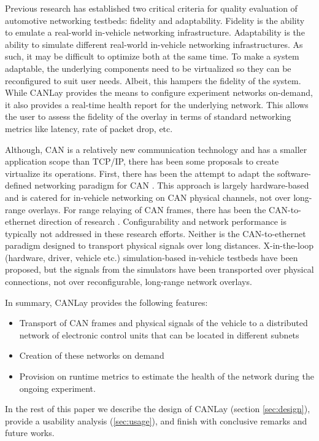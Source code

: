 \documentclass[letterpaper,twocolumn,12pt]{article}
\begin{document}
Previous research \cite{tagarev_automotive_2021} has established two critical criteria for quality evaluation of automotive networking testbeds: fidelity and adaptability. Fidelity is the ability to emulate a real-world in-vehicle networking infrastructure. Adaptability is the ability to simulate different real-world in-vehicle networking infrastructures. As such, it may be difficult to optimize both at the same time. To make a system adaptable, the underlying components need to be virtualized so they can be reconfigured to suit user needs. Albeit, this hampers the fidelity of the system. While CANLay provides the means to configure experiment networks on-demand, it also provides a real-time health report for the underlying network. This allows the user to assess the fidelity of the overlay in terms of standard networking metrics like latency, rate of packet drop, etc.

Although, CAN is a relatively new communication technology and has a smaller application scope than TCP/IP, there has been some proposals to create virtualize its operations. 
First, there has been the attempt to adapt the software-defined networking paradigm for CAN \cite{rotermund_requirements_2020,doering_retrofitting_nodate,grewe_bloomycan_2021}. This approach is largely hardware-based and is catered for in-vehicle networking on CAN physical channels, not over long-range overlays. For range relaying of CAN frames, there has been the CAN-to-ethernet direction of research \cite{johanson_relaying_2009,florian_polzlbauer_experience_2019}. Configurability and network performance is typically not addressed in these research efforts. Neither is the CAN-to-ethernet paradigm designed to transport physical signals over long distances. 
X-in-the-loop (hardware, driver, vehicle etc.) simulation-based in-vehicle testbeds \cite{appel_safety_2020} have been proposed, but the signals from the simulators have been transported over physical connections, not over reconfigurable, long-range network overlays. 

In summary, CANLay provides the following features:
\begin{itemize}
    \item Transport of CAN frames and physical signals of the vehicle to a distributed network of electronic control units that can be located in different subnets
    \item Creation of these networks on demand
    \item Provision on runtime metrics to estimate the health of the network during the ongoing experiment.
\end{itemize}
In the rest of this paper we describe the design of CANLay (section \ref{sec:design}), provide a usability analysis (\ref{sec:usage}), and finish with conclusive remarks and future works.
\end{document}
